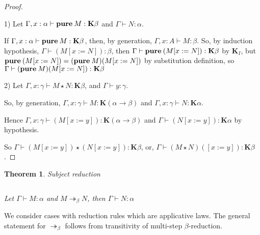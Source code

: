 \documentclass[a4paper]{article}
\newtheorem{theorem}{Theorem}
\begin{document}
  \begin{proof}

  $ $

  1) Let $\Gamma, x : \alpha \vdash {\bf pure \: } M : \textbf{K}\beta$ and $\Gamma \vdash N : \alpha$.

  If $\Gamma, x : \alpha \vdash {\bf pure \: } M : \textbf{K}\beta$, then, by generation, $\Gamma, x : A \vdash
  M : \beta$. So, by induction hypothesis, $\Gamma \vdash (M [x := N]) : \beta $, then $\Gamma \vdash
  {\bf pure \: } (M [x := N]) : \textbf{K}\beta$ by $\textbf{K}_I$, but ${\bf pure \: } (M [x := N]) =
  ({\bf pure \: } M) (M [x := N])$
  by substitution definition, so $\Gamma \vdash ({\bf pure \: } M) (M [x := N]) : \textbf{K}\beta$

  2) Let $\Gamma, x : \gamma \vdash M \star N : \textbf{K}\beta$, and $\Gamma \vdash y : \gamma$.

  So, by generation, $\Gamma, x : \gamma \vdash M : \textbf{K}(\alpha \to \beta)$ and $\Gamma, x : \gamma
  \vdash N : \textbf{K}\alpha$.

  Hence $\Gamma, x : \gamma \vdash (M [x := y]) : \textbf{K}(\alpha \to \beta)$ and
  $\Gamma \vdash (N [x := y]): \textbf{K}\alpha$ by hypothesis.

  So $\Gamma \vdash (M [x := y]) \star (N [x := y]) : \textbf{K}\beta$, or, $\Gamma \vdash (M \star N) ([x
  := y]) : \textbf{K}\beta$.

  \end{proof}

  \vspace{\baselineskip}

  \begin{theorem} Subject reduction

  $ $

  Let $\Gamma \vdash M : \alpha$ and $M \twoheadrightarrow_{\beta} N$, then $\Gamma \vdash N : \alpha$

  \end{theorem}

  We consider cases with reduction rules which are applicative laws. The general statement for $\twoheadrightarrow_{\beta}$ follows from transitivity of multi-step $\beta$-reduction.
\end{document}
